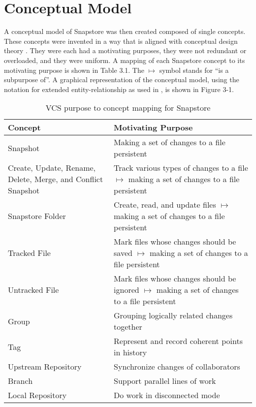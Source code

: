 \section{Conceptual Model}

A conceptual model of Snapstore was then created composed of single concepts. These concepts were invented in a way that is aligned with conceptual design theory \cite{Jackson}. They were each had a motivating purposes, they were not redundant or overloaded, and they were uniform. A mapping of each Snapstore concept to its motivating purpose is shown in Table 3.1. The $\mapsto$ symbol stands for ``is a subpurpose of''. A graphical representation of the conceptual model, using the notation for extended entity-relationship as used in \cite{Jackson}, is shown in Figure 3-1.

\vspace{6mm}

\begin{table}
\begin{tabular}{ |p{6cm}||p{9cm}|  }
 \hline
 \textbf{Concept} & \textbf{Motivating Purpose} \\[8pt]
 \hline
 Snapshot & Making a set of changes to a file persistent\\[8pt]
 Create, Update, Rename, Delete, Merge, and Conflict Snapshot & Track various types of changes to a file $\mapsto$ making a set of changes to a file persistent\\[8pt]
 Snapstore Folder & Create, read, and update files $\mapsto$ making a set of changes to a file persistent\\[8pt]
 Tracked File & Mark files whose changes should be saved $\mapsto$ making a set of changes to a file persistent\\[8pt]
 Untracked File & Mark files whose changes should be ignored $\mapsto$ making a set of changes to a file persistent\\[8pt]
 \hline
 Group & Grouping logically related changes together\\[8pt]
 Tag & Represent and record coherent points in history\\[8pt]
 \hline
 Upstream Repository & Synchronize changes of collaborators\\[8pt]
 Branch & Support parallel lines of work\\[8pt]
 Local Repository & Do work in disconnected mode\\[8pt]
 \hline
\end{tabular}
\caption{VCS purpose to concept mapping for Snapstore}
\end{table}

